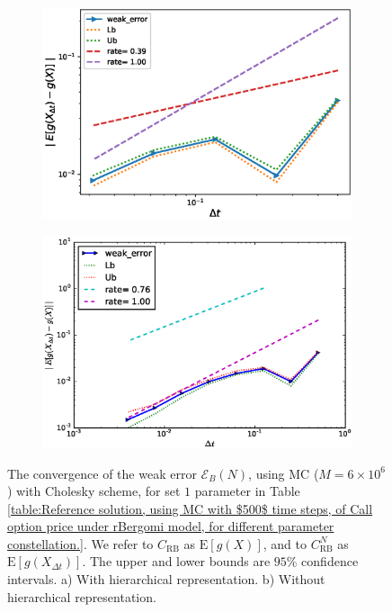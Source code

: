 \documentclass[11pt]{article}
\newcommand{\expt}[1]{\mathrm{E}\left[#1\right]}
\begin{document}
\FloatBarrier
\begin{figure}[h!]
	\centering
	\begin{subfigure}{.5\textwidth}
		\centering
		\includegraphics[width=1\linewidth]{./figures/rBergomi_weak_error_cholesky/weak_convergence_order_Bergomi_H_007_K_1_M_6_10_6_CI_relative_cholesky_hierarchical}
		\caption{}
		\label{fig:sub3}
	\end{subfigure}%
	\begin{subfigure}{.5\textwidth}
		\centering
		\includegraphics[width=1\linewidth]{./figures/rBergomi_weak_error_cholesky/weak_convergence_order_Bergomi_H_007_K_1_M_4_10_6_CI_relative_cholesky_non_hierarchical_non_parallel}
		\caption{}
		\label{fig:sub4}
	\end{subfigure}
	
	\caption{The  convergence of the weak error $\mathcal{E}_B(N)$, using MC ($M=6 \times 10^6$) with Cholesky scheme, for set $1$ parameter in Table \ref{table:Reference solution, using MC with $500$ time steps, of Call option price under rBergomi model, for different parameter constellation.}. We refer to $C_{\text{RB}}$ as $\expt{g(X)}$, and to $C_{\text{RB}}^{N}$ as  $\expt{g(X_{\Delta t})}$. The upper and lower bounds are $95\%$ confidence intervals. a) With hierarchical representation.  b) Without hierarchical representation.}
	\label{fig:Weak_rate_set1_set_2_without_rich}
\end{figure}
\FloatBarrier
\end{document}
